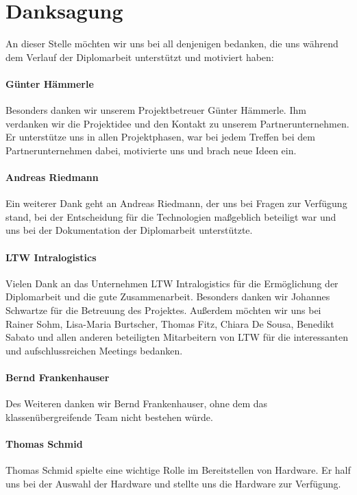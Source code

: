\section*{Danksagung}

An dieser Stelle möchten wir uns bei all denjenigen bedanken, die uns während dem Verlauf der Diplomarbeit unterstützt und motiviert haben: \\

\paragraph*{Günter Hämmerle}
Besonders danken wir unserem Projektbetreuer Günter Hämmerle. Ihm verdanken wir die Projektidee und den Kontakt zu unserem Partnerunternehmen. Er unterstütze uns in allen Projektphasen, war bei jedem Treffen bei dem Partnerunternehmen dabei, motivierte uns und brach neue Ideen ein.

\paragraph*{Andreas Riedmann}
Ein weiterer Dank geht an Andreas Riedmann, der uns bei Fragen zur Verfügung stand, bei der Entscheidung für die Technologien maßgeblich beteiligt war und uns bei der Dokumentation der Diplomarbeit unterstützte.

\paragraph*{LTW Intralogistics}
Vielen Dank an das Unternehmen LTW Intralogistics für die Ermöglichung der Diplomarbeit und die gute Zusammenarbeit. Besonders danken wir Johannes Schwartze für die Betreuung des Projektes. Außerdem möchten wir uns bei Rainer Sohm, Lisa-Maria Burtscher, Thomas Fitz, Chiara De Sousa, Benedikt Sabato und allen anderen beteiligten Mitarbeitern von LTW für die interessanten und aufschlussreichen Meetings bedanken.

\paragraph*{Bernd Frankenhauser}
Des Weiteren danken wir Bernd Frankenhauser, ohne dem das klassenübergreifende Team nicht bestehen würde.

\paragraph*{Thomas Schmid}
Thomas Schmid spielte eine wichtige Rolle im Bereitstellen von Hardware. Er half uns bei der Auswahl der Hardware und stellte uns die Hardware zur Verfügung.

